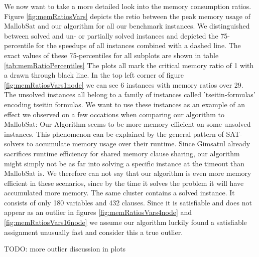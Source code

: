 \documentclass[12pt,a4paper,twoside]{scrartcl}
\numberwithin{equation}{section}
\begin{document}
\label{sec:peakMemRatios}
We now want to take a more detailed look into the memory consumption ratios. Figure \ref{fig:memRatiosVars} depicts the retio between the peak memory usage of MallobSat and our algorithm for all our benchmark instances. We distinguished between solved and un- or partially solved instances and depicted the 75-percentile for the speedups of all instances combined with a dashed line. The exact values of these 75-percentiles for all subplots are shown in table \ref{tab:memRatioPercentiles} The plots all mark the critical memory ratio of 1 with a drawn through black line.
In the top left corner of figure \ref{fig:memRatiosVars1node} we can see 6 instances with memory ratios over 29. The unsolved instances all belong to a family of instances called 'tseitin-formulas' encoding tseitin formulas. We want to use these instances as an example of an effect we observed on a few occations when comparing our algorithm to MallobSat: Our Algorithm seems to be more memory efficient on some unsolved instances. This phenomenon can be explained by the general pattern of SAT-solvers to accumulate memory usage over their runtime. Since Gimsatul already sacrifices runtime efficiency for shared memory clause sharing, our algorithm might simply not be as far into solving a specific instance at the timeout than MallobSat is. We therefore can not say that our algorithm is even more memory efficient in these scenarios, since by the time it solves the problem it will have accumulated more memory.
The same cluster contains a solved instance. It consists of only 180 variables and 432 clauses. Since it is satisfiable and does not appear as an outlier in figures \ref{fig:memRatiosVars4node} and \ref{fig:memRatiosVars16node} we assume our algorithm luckily found a satisfiable assignment unusually fast and consider this a true outlier.

TODO: more outlier discussion in plots
\end{document}

